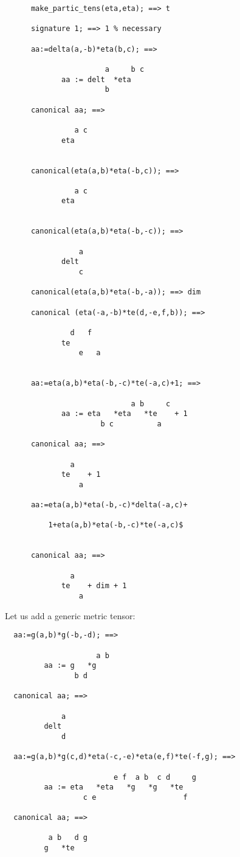 \begin{verbatim}
      make_partic_tens(eta,eta); ==> t

      signature 1; ==> 1 % necessary

      aa:=delta(a,-b)*eta(b,c); ==>

                       a     b c
             aa := delt  *eta
                       b

      canonical aa; ==>

                a c
             eta


      canonical(eta(a,b)*eta(-b,c)); ==>

                a c
             eta


      canonical(eta(a,b)*eta(-b,-c)); ==>

                 a
             delt
                 c

      canonical(eta(a,b)*eta(-b,-a)); ==> dim

      canonical (eta(-a,-b)*te(d,-e,f,b)); ==>

               d   f
             te
                 e   a


      aa:=eta(a,b)*eta(-b,-c)*te(-a,c)+1; ==>

                             a b     c
             aa := eta   *eta   *te    + 1
                      b c          a

      canonical aa; ==>

               a
             te    + 1
                 a

      aa:=eta(a,b)*eta(-b,-c)*delta(-a,c)+

          1+eta(a,b)*eta(-b,-c)*te(-a,c)$


      canonical aa; ==>

               a
             te    + dim + 1
                 a
\end{verbatim}
Let us add a generic metric %
 tensor:
\begin{verbatim}
  aa:=g(a,b)*g(-b,-d); ==>

                     a b
         aa := g   *g
                b d

  canonical aa; ==>

             a
         delt
             d

  aa:=g(a,b)*g(c,d)*eta(-c,-e)*eta(e,f)*te(-f,g); ==>

                         e f  a b  c d     g
         aa := eta   *eta   *g   *g   *te
                  c e                    f

  canonical aa; ==>

          a b   d g
         g   *te
\end{verbatim}
